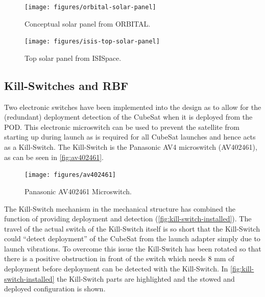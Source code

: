 \begin{figure}[!ht]
    \begin{center}
        \texttt{[image: figures/orbital-solar-panel]}
        \caption{Conceptual solar panel from ORBITAL.}
        \label{fig:solar-panel-orbital}
    \end{center}
\end{figure}

\begin{figure}[!ht]
    \begin{center}
        \texttt{[image: figures/isis-top-solar-panel]}
        \caption{Top solar panel from ISISpace.}
        \label{fig:top-solar-panel}
    \end{center}
\end{figure}

\subsection{Kill-Switches and RBF}

Two electronic switches have been implemented into the design as to allow for the (redundant) deployment detection of the CubeSat when it is deployed from the POD. This electronic microswitch can be used to prevent the satellite from starting up during launch as is required for all CubeSat launches and hence acts as a Kill-Switch. The Kill-Switch is the Panasonic AV4 microswitch (AV402461), as can be seen in \autoref{fig:av402461}.

\begin{figure}[!ht]
    \begin{center}
        \texttt{[image: figures/av402461]}
        \caption{Panasonic AV402461 Microswitch.}
        \label{fig:av402461}
    \end{center}
\end{figure}

The Kill-Switch mechanism in the mechanical structure has combined the function of providing deployment and detection (\autoref{fig:kill-switch-installed}). The travel of the actual switch of the Kill-Switch itself is so short that the Kill-Switch could ``detect deployment'' of the CubeSat from the launch adapter simply due to launch vibrations. To overcome this issue the Kill-Switch has been rotated so that there is a positive obstruction in front of the switch which needs 8 mm of deployment before deployment can be detected with the Kill-Switch. In \autoref{fig:kill-switch-installed} the Kill-Switch parts are highlighted and the stowed and deployed configuration is shown.


